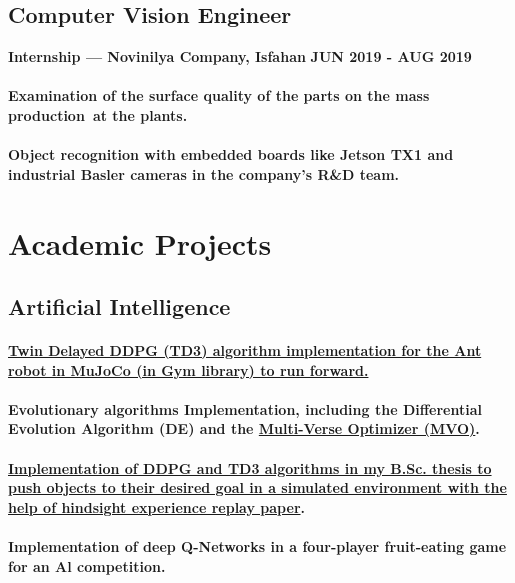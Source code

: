 \documentclass[a4paper]{article}
\begin{document}
        \subsection{Computer Vision Engineer}
        {\bfseries\small Internship — Novinilya Company, Isfahan}
        \hfill
        {\bfseries\small JUN 2019 - AUG 2019}\nopagebreak
        
        \paragraph{Examination of the surface quality of the parts on the mass production at the plants.}
        \paragraph{Object recognition with embedded boards like Jetson TX1 and industrial Basler cameras in the company's R\&D team.}

    \section{Academic Projects}

        \subsection{Artificial Intelligence}

            \paragraph{\href{https://github.com/ake1999/TD3_Ant_v4}{Twin Delayed DDPG (TD3) algorithm implementation for the Ant robot in MuJoCo (in Gym library) to run forward.}}
            \paragraph{Evolutionary algorithms Implementation, including the Differential Evolution Algorithm (DE) and the \href{https://github.com/ake1999/MVO_MATLAB}{Multi-Verse Optimizer (MVO)}.}
            \paragraph{\href{https://github.com/ake1999/aarm}{Implementation of DDPG and TD3 algorithms in my B.Sc. thesis to push objects to their desired goal in a simulated environment with the help of hindsight experience replay paper}.}
            \paragraph{Implementation of deep Q-Networks in a four-player fruit-eating game for an Al competition.}
\end{document}
